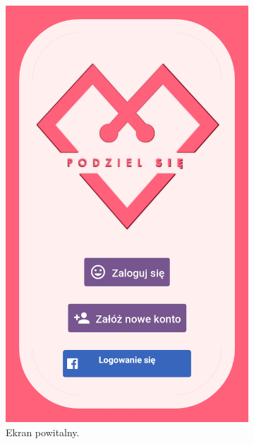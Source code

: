 \documentclass[licencjacka]{pracamgr}
\begin{document}
\newpage
\begin{figure}[H]
  \centering

  \begin{subfigure}[b]{0.4\linewidth}
    \begin{framed}
      \includegraphics[width=\linewidth]{rejestracja1.png}
    \end{framed}
    \caption{Ekran powitalny.}
  \end{subfigure}
  \begin{subfigure}[b]{0.4\linewidth}
    \begin{framed}

\end{framed}
\end{subfigure}
\end{figure}
\end{document}
